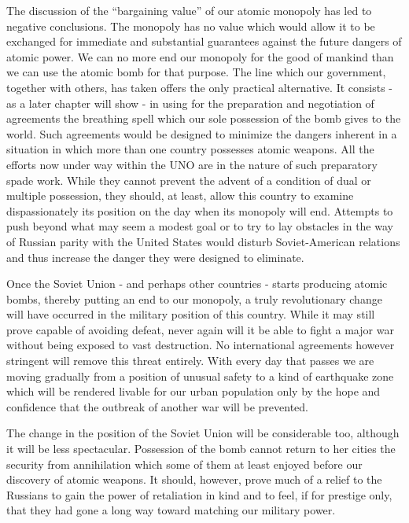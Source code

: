 The discussion of the ``bargaining value'' of our atomic monopoly has led to negative conclusions. The monopoly has no value which would allow it to be exchanged for immediate and substantial guarantees against the future dangers of atomic power. We can no more end our monopoly for the good of mankind than we can use the atomic bomb for that purpose. The line which our government, together with others, has taken offers the only practical alternative. It consists - as a later chapter will show - in using for the preparation and negotiation of agreements the breathing spell which our sole possession of the bomb gives to the world. Such agreements would be designed to minimize the dangers inherent in a situation in which more than one country possesses atomic weapons. All the efforts now under way within the UNO are in the nature of such preparatory spade work. While they cannot prevent the advent of a condition of dual or multiple possession, they should, at least, allow this country to examine dispassionately its position on the day when its monopoly will end. Attempts to push beyond what may seem a modest goal or to try to lay obstacles in the way of Russian parity with the United States would disturb Soviet-American relations and thus increase the danger they were designed to eliminate.

Once the Soviet Union - and perhaps other countries - starts producing atomic bombs, thereby putting an end to our monopoly, a truly revolutionary change will have occurred in the military position of this country. While it may still prove capable of avoiding defeat, never again will it be able to fight a major war without being exposed to vast destruction. No international agreements however stringent will remove this threat entirely. With every day that passes we are moving gradually from a position of unusual safety to a kind of earthquake zone which will be rendered livable for our urban population only by the hope and confidence that the outbreak of another war will be prevented.

The change in the position of the Soviet Union will be considerable too, although it will be less spectacular. Possession of the bomb cannot return to her cities the security from annihilation which some of them at least enjoyed before our discovery of atomic weapons. It should, however, prove much of a relief to the Russians to gain the power of retaliation in kind and to feel, if for prestige only, that they had gone a long way toward matching our military power.


